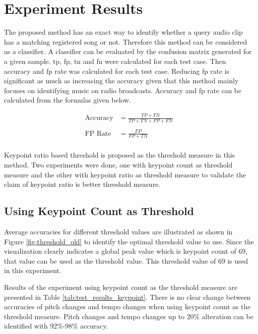 \section{Experiment Results}
\label{section:results}

The proposed method has an exact way to identify whether a query audio clip has a matching registered song or not. Therefore this method can be considered as
a classifier. A classifier can be evaluated by the confusion matrix generated for a given sample. \ac{tp}, \ac{fp}, \ac{tn} and \ac{fn} were calculated
for each test case. Then accuracy and \ac{fp} rate was calculated for each test case. Reducing \ac{fp} rate is significant as much as increasing the accuracy
given that this method mainly focuses on identifying music on radio broadcasts. Accuracy and \ac{fp} rate can be calculated from the formulas given below. 

\begin{align*}
    \text{Accuracy} &= \frac{TP+TN}{TP+TN+FP+FN}\\
    \\
    \text{FP Rate} &= \frac{FP}{FP+TN}\\
\end{align*}

Keypoint ratio based threshold is proposed as the threshold measure in this method. Two experiments were done, one with keypoint count as threshold measure and the
other with keypoint ratio as threshold measure to validate the claim of keypoint ratio is better threshold measure. 

\subsection{Using Keypoint Count as Threshold}

Average accuracies for different threshold values are illustrated as shown in Figure \ref{fig:threshold_old} to identify the optimal threshold value to use. Since
the visualization clearly indicates a global peak value which is keypoint count of 69, that value can be used as the threshold value. This threshold value of 69 is
used in this experiment. 
\vspace{12pt}

Results of the experiment using keypoint count as the threshold measure are presented in Table \ref{tab:test_results_keypoint}. There is no clear
change between accuracies of pitch changes and tempo changes when using keypoint count as the threshold measure. Pitch changes and tempo changes
up to 20\% alteration can be identified with 92\%-98\% accuracy. 



